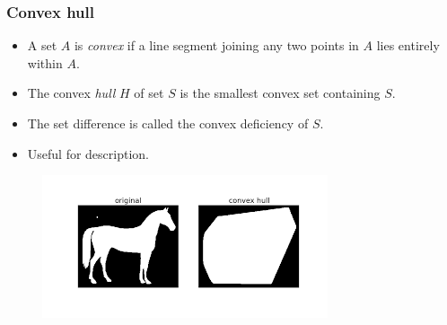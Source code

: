 \begin{frame}
\frametitle{Convex hull}
\begin{itemize}
\item A set $A$ is \textit{convex} if a line segment joining any two points in $A$ lies entirely within $A$.
\item The convex \textit{hull} $H$ of set $S$ is the smallest convex set containing $S$.
\item The set difference is called the convex deficiency of $S$.
\item Useful for description.
\end{itemize}
\begin{figure}[!h]
\includegraphics[width=.7\textwidth]{convhull}
\end{figure}
\end{frame}

